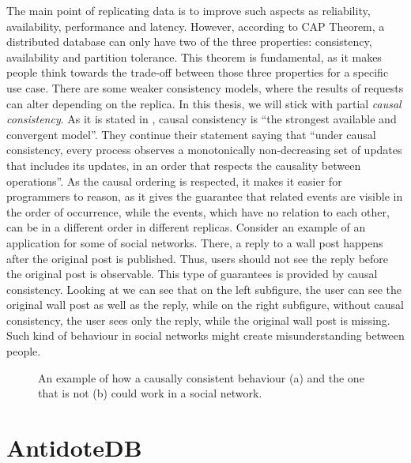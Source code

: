 The main point of replicating data is to improve such aspects as reliability, availability, performance and latency. However, according to CAP Theorem\cite{29}, a distributed database can only have two of the three properties: consistency, availability and partition tolerance. This theorem is fundamental, as it makes people think towards the trade-off between those three properties for a specific use case. There are some weaker consistency models, where the results of requests can alter depending on the replica\cite{28}.  In this thesis, we will stick with partial \textit{causal consistency}. As it is stated in \citet{7}, causal consistency is ``the strongest available and convergent model''. They continue their statement saying that ``under causal consistency, every process observes a monotonically non-decreasing set of updates that includes its updates, in an order that respects the causality between operations''. As the causal ordering is respected, it makes it easier for programmers to reason, as it gives the guarantee that related events are visible in the order of occurrence, while the events, which have no relation to each other, can be in a different order in different replicas. Consider an example of an application for some of social networks. There, a reply to a wall post happens after the original post is published. Thus, users should not see the reply before the original post is observable. This type of guarantees is provided by causal consistency. Looking at  we can see that on the left subfigure, the user can see the original wall post as well as the reply, while on the right subfigure, without causal consistency, the user sees only the reply, while the original wall post is missing. Such kind of behaviour in social networks might create misunderstanding between people. 

\begin{figure}%
    \centering
    \def\svgwidth{0.4\linewidth}
    \subfloat[]{{}}%
    \qquad
    \def\svgwidth{0.4\linewidth}
    \subfloat[]{{}}%
    \caption{An example of how a causally consistent behaviour (a) and the one that is not (b) could work in a social network.}%
    \label{fig:theory3}%
\end{figure}





\section{AntidoteDB}
\label{2-antidotedb}

